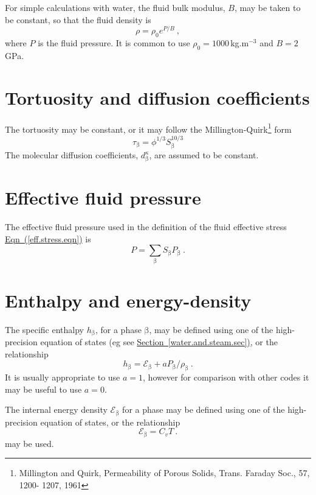 \documentclass[12pt]{report}
\def\species{\kappa}
\def\phase{\mathrm{\beta}}
\def\energydens{\mathcal{E}}
\begin{document}
For simple calculations with water, the fluid bulk modulus, $B$, may be
taken to be constant, so that the fluid density is
\begin{equation}
\rho = \rho_{0}e^{P/B} \ ,
\end{equation}
where $P$ is the fluid pressure.  It is common to use $\rho_{0} =
1000$\,kg.m$^{-3}$ and $B = 2$\,GPa.

\section{Tortuosity and diffusion coefficients}

The tortuosity may be constant, or it may follow the
Millington-Quirk\footnote{Millington and Quirk, Permeability of Porous
  Solids, Trans. Faraday Soc., 57, 1200- 1207, 1961} form
\begin{equation}
\tau_{\phase} = \phi^{1/3}S_{\phase}^{10/3}
\end{equation}
The molecular diffusion coefficients, $d_{\phase}^{\species}$, are
assumed to be constant.

\section{Effective fluid pressure}

The effective fluid pressure used in the definition of the fluid
effective stress \hyperref[eff.stress.eqn]{Eqn~(\ref*{eff.stress.eqn})} is
\begin{equation}
P = \sum_{\phase} S_{\phase}P_{\phase} \ .
\end{equation}

\section{Enthalpy and energy-density}

The specific enthalpy $h_{\phase}$, for a phase $\phase$, may be
defined using one of the high-precision equation of states (eg see
\hyperref[water.and.steam.sec]{Section~\ref*{water.and.steam.sec})},
or the relationship
\begin{equation}
h_{\phase} = \energydens_{\phase} + a P_{\phase}/\rho_{\phase} \ .
\end{equation}
It is usually appropriate to use $a=1$, however for comparison with
other codes it may be useful to use $a=0$.

The internal energy density $\energydens_{\phase}$ for a phase may be
defined using one of the high-precision equation of states, or the
relationship
\begin{equation}
\energydens_{\phase} = C_{v}T \ .
\end{equation}
may be used.
\end{document}
